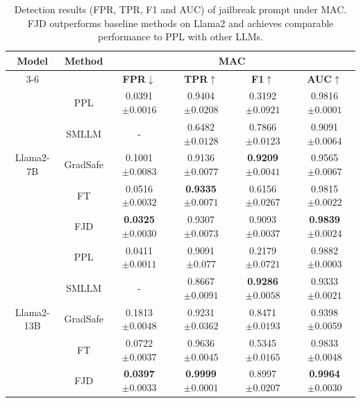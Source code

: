 \documentclass{article}
\begin{document}
\begin{table}[t]
  \caption{Detection results (FPR, TPR, F1 and AUC) of jailbreak prompt under MAC. FJD outperforms baseline methods on Llama2 and achieves comparable performance to PPL with other LLMs.}
  \label{mac auc}

  \centering
  \setlength\tabcolsep{14pt}
  \footnotesize

  \begin{tabular}{cccccc}
    \toprule
    \multirow{2}{*}{\textbf{Model}}  &  \multirow{2}{*}{\textbf{Method}} & \multicolumn{4}{c}{\textbf{MAC}} \\
    \cmidrule(r){3-6}

    & & \textbf{FPR$\downarrow$}& \textbf{TPR$\uparrow$}& \textbf{F1$\uparrow$}&\textbf{AUC$\uparrow$}\\
    
    \midrule
    \multirow{5}{*}{Llama2-7B} 
    & PPL  & 0.0391\tiny{$\pm 0.0016$} & 0.9404\tiny{$\pm 0.0208$} & 0.3192\tiny{$\pm 0.0921$} & 0.9816\tiny{$\pm 0.0001$} \\
    & SMLLM & - & 0.6482\tiny{$\pm 0.0128$} & 0.7866\tiny{$\pm 0.0123$} & 0.9091\tiny{$\pm 0.0064$}  \\
    & GradSafe  & 0.1001\tiny{$\pm 0.0083$} & 0.9136\tiny{$\pm 0.0077$} & \textbf{0.9209}\tiny{$\pm 0.0041$} & 0.9565\tiny{$\pm 0.0067$} \\
    & FT & 0.0516\tiny{$\pm 0.0032$} & \textbf{0.9335}\tiny{$\pm 0.0071$} & 0.6156\tiny{$\pm 0.0267$} & 0.9815\tiny{$\pm 0.0022$} \\
    & FJD & \textbf{0.0325}\tiny{$\pm 0.0030$} & 0.9307\tiny{$\pm 0.0073$} & 0.9093\tiny{$\pm 0.0037$} & \textbf{0.9839}\tiny{$\pm 0.0024$}  \\
    \midrule
    \multirow{5}{*}{Llama2-13B} 
    & PPL & 0.0411\tiny{$\pm 0.0011$} & 0.9091\tiny{$\pm 0.077$} & 0.2179\tiny{$\pm 0.0721$} & 0.9882\tiny{$\pm 0.0003$} \\
    & SMLLM & - & 0.8667\tiny{$\pm 0.0091$} & \textbf{0.9286}\tiny{$\pm 0.0058$} & 0.9333\tiny{$\pm 0.0021$} \\
    & GradSafe & 0.1813\tiny{$\pm 0.0048$} & 0.9231\tiny{$\pm 0.0362$} & 0.8471\tiny{$\pm 0.0193$} & 0.9398\tiny{$\pm 0.0059$} \\
    & FT & 0.0722\tiny{$\pm 0.0037$} & 0.9636\tiny{$\pm 0.0045$} & 0.5345\tiny{$\pm 0.0165$} & 0.9833\tiny{$\pm 0.0048$} \\
    & FJD & \textbf{0.0397}\tiny{$\pm 0.0033$} & \textbf{0.9999}\tiny{$\pm 0.0001$} & 0.8997\tiny{$\pm 0.0207$} & \textbf{0.9964}\tiny{$\pm 0.0030$} \\
    

\end{tabular}
\end{table}
\end{document}
